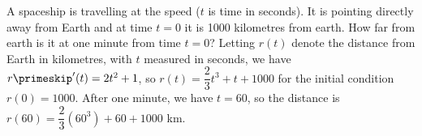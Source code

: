 {A spaceship is travelling at the speed  ($t$ is
time in seconds).  It is pointing directly away from Earth and at time $t=0$
it is 1000 kilometres from earth.  How far from earth is it at one minute from
time $t=0$?}
{Letting $r(t)$ denote the distance from Earth in kilometres, with $t$ measured in seconds, we have $r\primeskip'(t) = 2t^2+1$, so $r(t) = \dfrac{2}{3}t^3+t+1000$ for the initial condition $r(0)=1000$. After one minute, we have $t=60$, so the distance is $r(60) = \dfrac{2}{3}(60^3)+60+1000$ km.}